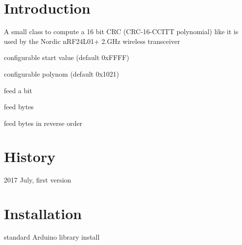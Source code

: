 \hypertarget{index_intro_sec}{}\section{Introduction}\label{index_intro_sec}
A small class to compute a 16 bit C\+RC (C\+R\+C-\/16-\/\+C\+C\+I\+TT polynomial) like it is used by the Nordic n\+R\+F24\+L01+ 2.\+G\+Hz wireless transceiver


\begin{DoxyItemize}
\item configurable start value (default 0x\+F\+F\+FF)
\item configurable polynom (default 0x1021)
\item feed a bit
\item feed bytes
\item feed bytes in reverse order
\end{DoxyItemize}\hypertarget{index_hist_sec}{}\section{History}\label{index_hist_sec}

\begin{DoxyItemize}
\item 2017 July, first version
\end{DoxyItemize}\hypertarget{index_install_sec}{}\section{Installation}\label{index_install_sec}
standard Arduino library install 